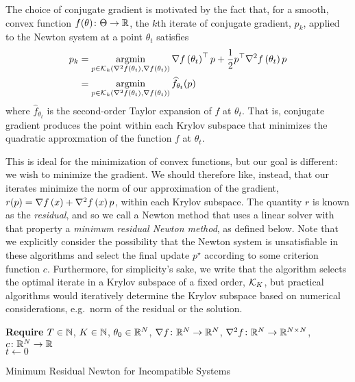 \documentclass[../../thesis.tex]{subfiles}
\begin{document}
The choice of conjugate gradient is motivated
by the fact that, for a smooth, convex
function $f(\theta) \colon \Theta \to \mathbb{R}$,
the $k$th iterate of conjugate gradient, $p_k$,
applied to the Newton system at a point $\theta_t$ satisfies
\begin{align}
	p_k
	&= \mathop{\mathrm{argmin}}_{p \in {\mathcal{K}}_k\left(\nabla^2f\left(\theta_t\right), \nabla f\left(\theta_t\right)\right)}
	\nabla f\left(\theta_t\right)^\top p + \frac{1}{2} p^\top\nabla^2f\left(\theta_t\right)p\\
	&= \mathop{\mathrm{argmin}}_{p \in {\mathcal{K}}_k\left(\nabla^2f\left(\theta_t\right), \nabla f\left(\theta_t\right)\right)}
	\widehat{f}_{\theta_t}(p)
\end{align}
\noindent where $\hat{f}_{\theta_t}$
is the second-order Taylor expansion of $f$
at $\theta_t$.
That is, conjugate gradient produces
the point within each Krylov subspace
that minimizes the quadratic approxmation
of the function $f$ at $\theta_t$.

This is ideal for the minimization of convex functions,
but our goal is different:
we wish to minimize the gradient.
We should therefore like, instead,
that our iterates minimize
the norm of our approximation of the gradient,
$r(p) = \nabla f\left(x\right) + \nabla^2f\left(x\right)p$,
within each Krylov subspace.
The quantity $r$ is known as the \emph{residual},
and so we call a Newton method that uses
a linear solver with that property
a \emph{minimum residual Newton method},
as defined below.
Note that we explicitly consider
the possibility that the Newton system is unsatisfiable
in these algorithms and select the final update $p^\star{}$
according to some criterion function $c$.
Furthermore, for simplicity's sake,
we write that the algorithm selects the optimal
iterate in a Krylov subspace of a fixed order,
${\mathcal{K}}_K$, but practical algorithms
would iteratively determine  the Krylov subspace
based on numerical considerations,
e.g.~norm of the residual or the solution.
\\
\begin{algorithm}[H]
    \SetAlgoLined{}
    \textbf{Require}
    $T\in \mathbb{N}$, $K \in \mathbb{N}$, $\theta_0 \in \mathbb{R}^N$,
    $\nabla{f}\colon\mathbb{R}^N\to\mathbb{R}^N$,
    $\nabla^2{f}\colon\mathbb{R}^N\to\mathbb{R}^{N\times N}$,
    $c\colon \mathbb{R}^N \to \mathbb{R}$\\
    $t \leftarrow 0$\\
    \caption{Minimum Residual Newton for Incompatible Systems}
\end{algorithm}
\end{document}
